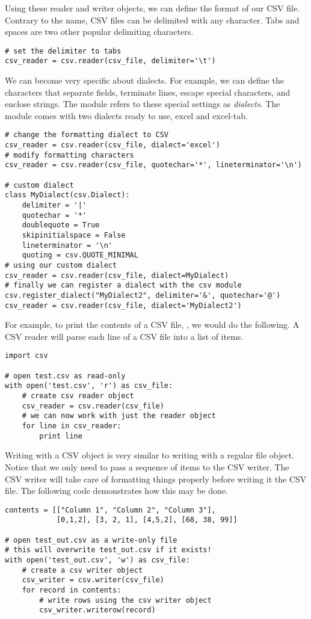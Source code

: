 Using these reader and writer objects, we can define the format of our CSV file.  Contrary to the name, CSV files can be delimited with any character.  Tabs and spaces are two other popular delimiting characters.
\begin{lstlisting}
# set the delimiter to tabs
csv_reader = csv.reader(csv_file, delimiter='\t')
\end{lstlisting}

We can become very specific about dialects.
For example, we can define the characters that separate fields, terminate lines, escape special characters, and enclose strings.
The  module refers to these special settings as \emph{dialects}.
The module comes with two dialects ready to use, excel and excel-tab.
\begin{lstlisting}
# change the formatting dialect to CSV
csv_reader = csv.reader(csv_file, dialect='excel')
# modify formatting characters
csv_reader = csv.reader(csv_file, quotechar='*', lineterminator='\n')

# custom dialect
class MyDialect(csv.Dialect):
    delimiter = '|'
    quotechar = '*'
    doublequote = True
    skipinitialspace = False
    lineterminator = '\n'
    quoting = csv.QUOTE_MINIMAL
# using our custom dialect
csv_reader = csv.reader(csv_file, dialect=MyDialect)
# finally we can register a dialect with the csv module
csv.register_dialect("MyDialect2", delimiter='&', quotechar='@')
csv_reader = csv.reader(csv_file, dialect='MyDialect2')
\end{lstlisting}

For example, to print the contents of a CSV file, , we would do the following.  A CSV reader will parse each line of a CSV file into a list of items.
\begin{lstlisting}
import csv

# open test.csv as read-only
with open('test.csv', 'r') as csv_file:
    # create csv reader object
    csv_reader = csv.reader(csv_file)
    # we can now work with just the reader object
    for line in csv_reader:
        print line
\end{lstlisting}

Writing with a CSV  object is very similar to writing with a regular file object.  Notice that we only need to pass a sequence of items to the CSV writer.  The CSV writer will take care of formatting things properly before writing it the CSV file.
The following code demonstrates how this may be done.
\begin{lstlisting}
contents = [["Column 1", "Column 2", "Column 3"],
            [0,1,2], [3, 2, 1], [4,5,2], [68, 38, 99]]
            
# open test_out.csv as a write-only file
# this will overwrite test_out.csv if it exists!
with open('test_out.csv', 'w') as csv_file:
    # create a csv writer object
    csv_writer = csv.writer(csv_file)
    for record in contents:
        # write rows using the csv writer object
        csv_writer.writerow(record)
\end{lstlisting}

